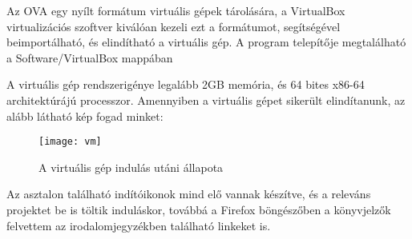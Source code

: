 Az OVA egy nyílt formátum virtuális gépek tárolására, a VirtualBox virtualizációs szoftver kiválóan kezeli ezt a formátumot, segítségével beimportálható, és elindítható a virtuális gép. A program telepítője megtalálható a Software/VirtualBox mappában\ujsor

A virtuális gép rendszerigénye legalább 2GB memória, és 64 bites x86-64 architektúrájú processzor. Amennyiben a virtuális gépet sikerült elindítanunk, az alább látható kép fogad minket:

\begin{figure}[ht]
	\texttt{[image: vm]}
	\centering
	\caption{A virtuális gép indulás utáni állapota}
	\label{fig:vm}
\end{figure}

Az asztalon található indítóikonok mind elő vannak készítve, és a releváns projektet be is töltik induláskor, továbbá a Firefox böngészőben a könyvjelzők felvettem az irodalomjegyzékben található linkeket is.
